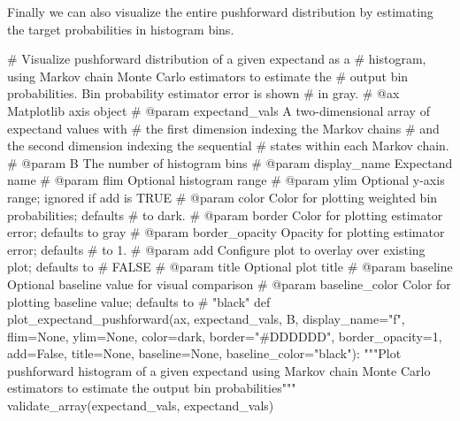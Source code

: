 \documentclass[
  letterpaper,
  DIV=11,
  numbers=noendperiod]{scrartcl}
\newenvironment{Shaded}{\begin{snugshade}}{\end{snugshade}}
\newcommand{\CommentTok}[1]{\textcolor[rgb]{0.37,0.37,0.37}{#1}}
\newcommand{\DecValTok}[1]{\textcolor[rgb]{0.68,0.00,0.00}{#1}}
\newcommand{\KeywordTok}[1]{\textcolor[rgb]{0.00,0.23,0.31}{#1}}
\newcommand{\NormalTok}[1]{\textcolor[rgb]{0.00,0.23,0.31}{#1}}
\newcommand{\OperatorTok}[1]{\textcolor[rgb]{0.37,0.37,0.37}{#1}}
\newcommand{\StringTok}[1]{\textcolor[rgb]{0.13,0.47,0.30}{#1}}
\newcommand{\VariableTok}[1]{\textcolor[rgb]{0.07,0.07,0.07}{#1}}
\begin{document}
Finally we can also visualize the entire pushforward distribution by
estimating the target probabilities in histogram bins.

\begin{Shaded}
\begin{Highlighting}[]
\CommentTok{\# Visualize pushforward distribution of a given expectand as a}
\CommentTok{\# histogram, using Markov chain Monte Carlo estimators to estimate the}
\CommentTok{\# output bin probabilities.  Bin probability estimator error is shown}
\CommentTok{\# in gray.}
\CommentTok{\# @ax Matplotlib axis object}
\CommentTok{\# @param expectand\_vals A two{-}dimensional array of expectand values with}
\CommentTok{\#                       the first dimension indexing the Markov chains}
\CommentTok{\#                       and the second dimension indexing the sequential}
\CommentTok{\#                       states within each Markov chain.}
\CommentTok{\# @param B The number of histogram bins}
\CommentTok{\# @param display\_name Expectand name}
\CommentTok{\# @param flim Optional histogram range}
\CommentTok{\# @param ylim Optional y{-}axis range; ignored if add is TRUE}
\CommentTok{\# @param color Color for plotting weighted bin probabilities; defaults}
\CommentTok{\#              to dark.}
\CommentTok{\# @param border Color for plotting estimator error; defaults to gray}
\CommentTok{\# @param border\_opacity Opacity for plotting estimator error; defaults}
\CommentTok{\#                       to 1.}
\CommentTok{\# @param add Configure plot to overlay over existing plot; defaults to}
\CommentTok{\#            FALSE}
\CommentTok{\# @param title Optional plot title}
\CommentTok{\# @param baseline Optional baseline value for visual comparison}
\CommentTok{\# @param baseline\_color Color for plotting baseline value; defaults to}
\CommentTok{\#                       "black"}
\KeywordTok{def}\NormalTok{ plot\_expectand\_pushforward(ax, expectand\_vals, B, display\_name}\OperatorTok{=}\StringTok{"f"}\NormalTok{,}
\NormalTok{                               flim}\OperatorTok{=}\VariableTok{None}\NormalTok{, ylim}\OperatorTok{=}\VariableTok{None}\NormalTok{,}
\NormalTok{                               color}\OperatorTok{=}\NormalTok{dark, border}\OperatorTok{=}\StringTok{"\#DDDDDD"}\NormalTok{,}
\NormalTok{                               border\_opacity}\OperatorTok{=}\DecValTok{1}\NormalTok{,}
\NormalTok{                               add}\OperatorTok{=}\VariableTok{False}\NormalTok{, title}\OperatorTok{=}\VariableTok{None}\NormalTok{,}
\NormalTok{                               baseline}\OperatorTok{=}\VariableTok{None}\NormalTok{, baseline\_color}\OperatorTok{=}\StringTok{"black"}\NormalTok{):}
  \CommentTok{"""Plot pushforward histogram of a given expectand using Markov chain}
\CommentTok{     Monte Carlo estimators to estimate the output bin probabilities"""}
\NormalTok{  validate\_array(expectand\_vals, }\StringTok{\textquotesingle{}expectand\_vals\textquotesingle{}}\NormalTok{)}


\end{Highlighting}
\end{Shaded}
\end{document}
